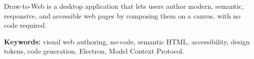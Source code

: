 
Draw-to-Web is a desktop application that lets users author modern, semantic,
responsive, and accessible web pages by composing them on a canvas, with no code
required. %

\vspace{0.5em}
\noindent\textbf{Keywords:} %
visual web authoring, no-code, semantic HTML, accessibility, design tokens,
code generation, Electron, Model Context Protocol.
